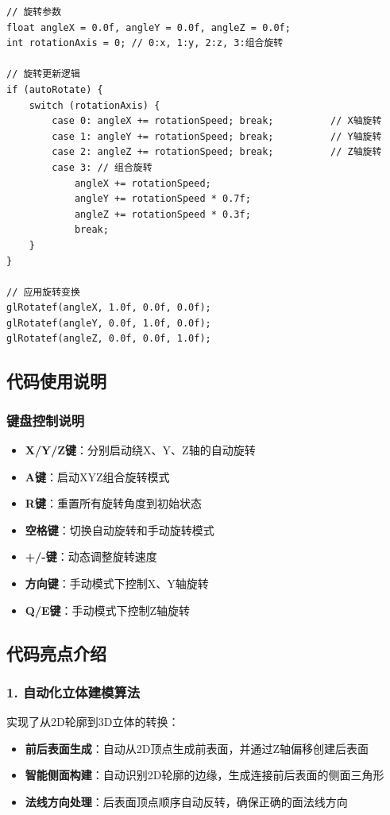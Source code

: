 \documentclass[a4paper]{article}
\begin{document}
\begin{lstlisting}[caption={多模式旋转系统}]
// 旋转参数
float angleX = 0.0f, angleY = 0.0f, angleZ = 0.0f;
int rotationAxis = 0; // 0:x, 1:y, 2:z, 3:组合旋转

// 旋转更新逻辑
if (autoRotate) {
    switch (rotationAxis) {
        case 0: angleX += rotationSpeed; break;          // X轴旋转
        case 1: angleY += rotationSpeed; break;          // Y轴旋转  
        case 2: angleZ += rotationSpeed; break;          // Z轴旋转
        case 3: // 组合旋转
            angleX += rotationSpeed;
            angleY += rotationSpeed * 0.7f;
            angleZ += rotationSpeed * 0.3f;
            break;
    }
}

// 应用旋转变换
glRotatef(angleX, 1.0f, 0.0f, 0.0f);
glRotatef(angleY, 0.0f, 1.0f, 0.0f);
glRotatef(angleZ, 0.0f, 0.0f, 1.0f);
\end{lstlisting}

\subsection{代码使用说明}
\subsubsection{键盘控制说明}
\begin{itemize}
    \item \textbf{X/Y/Z键}：分别启动绕X、Y、Z轴的自动旋转
    \item \textbf{A键}：启动XYZ组合旋转模式
    \item \textbf{R键}：重置所有旋转角度到初始状态
    \item \textbf{空格键}：切换自动旋转和手动旋转模式
    \item \textbf{+/-键}：动态调整旋转速度
    \item \textbf{方向键}：手动模式下控制X、Y轴旋转
    \item \textbf{Q/E键}：手动模式下控制Z轴旋转
\end{itemize}

\subsection{代码亮点介绍}

\subsubsection{1. 自动化立体建模算法}
实现了从2D轮廓到3D立体的转换：
\begin{itemize}
    \item \textbf{前后表面生成}：自动从2D顶点生成前表面，并通过Z轴偏移创建后表面
    \item \textbf{智能侧面构建}：自动识别2D轮廓的边缘，生成连接前后表面的侧面三角形
    \item \textbf{法线方向处理}：后表面顶点顺序自动反转，确保正确的面法线方向
\end{itemize}
\end{document}
